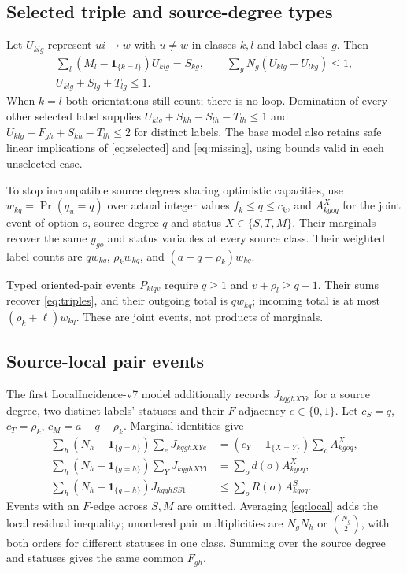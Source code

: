 \documentclass[11pt,a4paper]{article}
\newcommand{\ind}[1]{\mathbf1_{\{#1\}}}\newcommand{\pos}[1]{[#1]_+}\newcommand{\floor}[1]{\left\lfloor#1\right\rfloor}\newcommand{\ceil}[1]{\left\lceil#1\right\rceil}
\begin{document}
\subsection{Selected triple and source-degree types}
Let $U_{klg}$ represent $ui\to w$ with $u\ne w$ in classes $k,l$ and label class $g$. Then
\begin{gather}
 \sum_l(M_l-\ind{k=l})U_{klg}=S_{kg},\qquad
 \sum_gN_g(U_{klg}+U_{lkg})\le1,\label{eq:triples}\\
 U_{klg}+S_{lg}+T_{lg}\le1.\nonumber
\end{gather}
When $k=l$ both orientations still count; there is no loop. Domination of every other selected label supplies
$U_{klg}+S_{kh}-S_{lh}-T_{lh}\le1$ and
$U_{klg}+F_{gh}+S_{kh}-T_{lh}\le2$ for distinct labels. The base model also retains safe linear implications of \eqref{eq:selected} and \eqref{eq:missing}, using bounds valid in each unselected case.

To stop incompatible source degrees sharing optimistic capacities, use $w_{kq}=\Pr(q_u=q)$ over actual integer values $f_k\le q\le c_k$, and
$A^X_{kgoq}$ for the joint event of option $o$, source degree $q$ and status $X\in\{S,T,M\}$. Their marginals recover the same $y_{go}$ and status variables at every source class. Their weighted label counts are $q w_{kq}$, $\rho_k w_{kq}$, and $(a-q-\rho_k)w_{kq}$.

Typed oriented-pair events $P_{klqv}$ require $q\ge1$ and $v+\rho_l\ge q-1$. Their sums recover \eqref{eq:triples}, and their outgoing total is $q w_{kq}$; incoming total is at most $(\rho_k+\ell)w_{kq}$. These are joint events, not products of marginals.

\subsection{Source-local pair events}
The first LocalIncidence-v7 model additionally records $J_{kqghXYe}$ for a source degree, two distinct labels' statuses and their $F$-adjacency $e\in\{0,1\}$. Let $c_S=q$, $c_T=\rho_k$, $c_M=a-q-\rho_k$. Marginal identities give
\begin{align}
 \sum_h(N_h-\ind{g=h})\sum_eJ_{kqghXYe}
 &=(c_Y-\ind{X=Y})\sum_oA^X_{kgoq},\label{eq:J}\\
 \sum_h(N_h-\ind{g=h})\sum_YJ_{kqghXY1}
 &=\sum_od(o)A^X_{kgoq},\nonumber\\
 \sum_h(N_h-\ind{g=h})J_{kqghSS1}
 &\le\sum_oR(o)A^S_{kgoq}.\nonumber
\end{align}
Events with an $F$-edge across $S,M$ are omitted. Averaging \eqref{eq:local} adds the local residual inequality; unordered pair multiplicities are $N_gN_h$ or $\binom{N_g}{2}$, with both orders for different statuses in one class. Summing over the source degree and statuses gives the same common $F_{gh}$.
\end{document}
